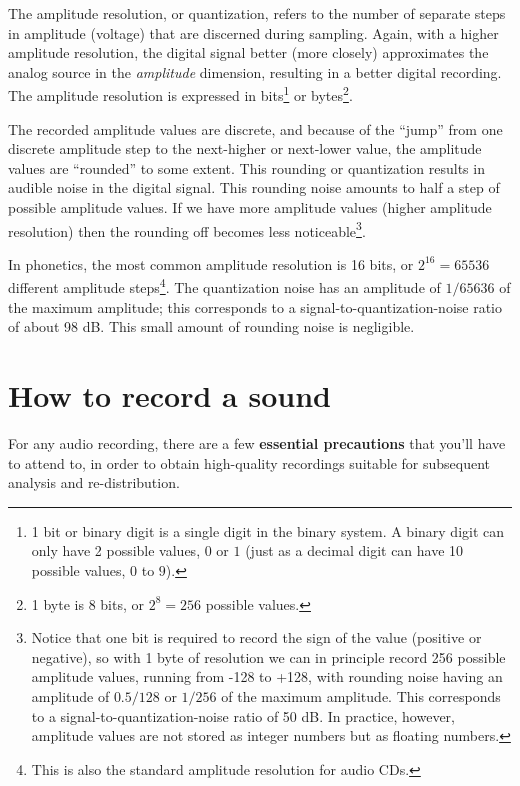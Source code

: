 \documentclass[
]{book}
\begin{document}
The amplitude resolution, or quantization, refers to the number of separate steps in amplitude (voltage) that are discerned during sampling. Again, with a higher amplitude resolution, the digital signal better (more closely) approximates the analog source in the \emph{amplitude} dimension, resulting in a better digital recording. The amplitude resolution is expressed in bits\footnote{1 bit or binary digit is a single digit in the binary system. A binary digit can only have 2 possible values, \(0\) or \(1\) (just as a decimal digit can have 10 possible values, \(0\) to \(9\)).} or bytes\footnote{1 byte is 8 bits, or \(2^8=256\) possible values.}.

The recorded amplitude values are discrete, and because of the ``jump'' from one discrete amplitude step to the next-higher or next-lower value, the amplitude values are ``rounded'' to some extent. This rounding or quantization results in audible noise in the digital signal. This rounding noise amounts to half a step of possible amplitude values. If we have more amplitude values (higher amplitude resolution) then the rounding off becomes less noticeable\footnote{Notice that one bit is required to record the sign of the value (positive or negative), so with 1 byte of resolution we can in principle record 256 possible amplitude values, running from -128 to +128, with rounding noise having an amplitude of \(0.5/128\) or \(1/256\) of the maximum amplitude. This corresponds to a signal-to-quantization-noise ratio of 50 dB. In practice, however, amplitude values are not stored as integer numbers but as floating numbers.}.

In phonetics, the most common amplitude resolution is 16 bits, or \(2^{16} = 65536\) different amplitude steps\footnote{This is also the standard amplitude resolution for audio CDs.}. The quantization noise has an amplitude of \(1/65636\) of the maximum amplitude; this corresponds to a signal-to-quantization-noise ratio of about 98 dB. This small amount of rounding noise is negligible.

\section{How to record a sound}\label{how-to-record-a-sound}

For any audio recording, there are a few \textbf{essential precautions} that you'll have to attend to, in order to obtain high-quality recordings suitable for subsequent analysis and re-distribution.

\label{recording}
\end{document}
